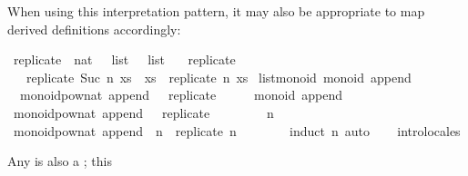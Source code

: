 \begin{isabellebody}
\begin{isamarkuptext}
  When using this interpretation pattern, it may also
  be appropriate to map derived definitions accordingly:%
\end{isamarkuptext}%
\isamarkuptrue%
%
\isadelimquote
%
\endisadelimquote
%
\isatagquote
{}\isamarkupfalse%
\ replicate\ {\isacharcolon}{\isacharcolon}\ {\isachardoublequoteopen}nat\ {\isasymRightarrow}\ {\isasymalpha}\ list\ {\isasymRightarrow}\ {\isasymalpha}\ list{\isachardoublequoteclose}\ \isanewline
\ \ {\isachardoublequoteopen}replicate\ {}\ {\isacharunderscore}\ {\isacharequal}\ {\isacharbrackleft}{\isacharbrackright}{\isachardoublequoteclose}\isanewline
\ \ {\isacharbar}\ {\isachardoublequoteopen}replicate\ {\isacharparenleft}Suc\ n{\isacharparenright}\ xs\ {\isacharequal}\ xs\ {\isacharat}\ replicate\ n\ xs{\isachardoublequoteclose}\isanewline
\isanewline
{}\isamarkupfalse%
\ list{\isacharunderscore}monoid{\isacharbang}{\isacharcolon}\ monoid\ append\ {\isachardoublequoteopen}{\isacharbrackleft}{\isacharbrackright}{\isachardoublequoteclose}\ \isanewline
\ \ {\isachardoublequoteopen}monoid{\isachardot}pow{\isacharunderscore}nat\ append\ {\isacharbrackleft}{\isacharbrackright}\ {\isacharequal}\ replicate{\isachardoublequoteclose}\isanewline
{}\isamarkupfalse%
\ {\isacharminus}\isanewline
\ \ \isamarkupfalse%
\ monoid\ append\ {\isachardoublequoteopen}{\isacharbrackleft}{\isacharbrackright}{\isachardoublequoteclose}\ \isacommand{{\isachardot}{\isachardot}}\isamarkupfalse%
\isanewline
\ \ \isamarkupfalse%
\ {\isachardoublequoteopen}monoid{\isachardot}pow{\isacharunderscore}nat\ append\ {\isacharbrackleft}{\isacharbrackright}\ {\isacharequal}\ replicate{\isachardoublequoteclose}\isanewline
\ \ \isamarkupfalse%
\isanewline
\ \ \ \ \isamarkupfalse%
\ n\isanewline
\ \ \ \ \isamarkupfalse%
\ {\isachardoublequoteopen}monoid{\isachardot}pow{\isacharunderscore}nat\ append\ {\isacharbrackleft}{\isacharbrackright}\ n\ {\isacharequal}\ replicate\ n{\isachardoublequoteclose}\isanewline
\ \ \ \ \ \ \isamarkupfalse%
\ {\isacharparenleft}induct\ n{\isacharparenright}\ auto\isanewline
\ \ \isamarkupfalse%
\isanewline
{}\isamarkupfalse%
\ intro{\isacharunderscore}locales%
\endisatagquote
{\isafoldquote}%
%
\isadelimquote
%
\endisadelimquote
%
\isamarkuptrue%
%
\begin{isamarkuptext}%
Any  is also a ;  this

\end{isamarkuptext}
\end{isabellebody}
